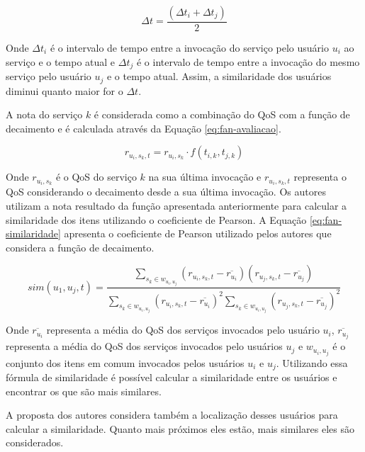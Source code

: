 \begin{equation}
  \label{eq:fan-fator-decaimento}
  \Delta t = \frac{(\Delta t_i + \Delta t_j)}{2}
\end{equation}

Onde $\Delta t_i$ é o intervalo de tempo entre a invocação do serviço pelo usuário $u_i$ ao serviço e o tempo atual e
$\Delta t_j$ é o intervalo de tempo entre a invocação do mesmo serviço pelo usuário $u_j$ e o tempo atual. Assim, a
similaridade dos usuários  diminui quanto maior for o $\Delta t$.

A nota do serviço $k$ é considerada como a combinação do QoS com a função de decaimento e é calculada através da Equação \ref{eq:fan-avaliacao}.

\begin{equation}
  \label{eq:fan-avaliacao}
  r_{u_i, s_k, t} = r_{u_i, s_k} \cdot f(t_{i,k}, t_{j,k})
\end{equation}

Onde $r_{u_i, s_k}$ é o QoS do serviço $k$ na sua última invocação e $r_{u_i, s_k, t}$ representa o QoS considerando o decaimento
desde a sua última invocação. Os autores utilizam a nota resultado da função apresentada anteriormente para calcular a similaridade dos itens utilizando
o coeficiente de Pearson. A Equação \ref{eq:fan-similaridade} apresenta o coeficiente de Pearson utilizado pelos autores
que considera a função de decaimento.

\begin{equation}
  \label{eq:fan-similaridade}
  sim(u_1, u_j, t) = \frac{\sum_{s_k \in w_{u_i, u_j}}{(r_{u_i, s_k, t} - \overline{r_{u_i}})(r_{u_j, s_k, t} - \overline{r_{u_j}})}}{\sum_{s_k \in w_{u_i, u_j}}{(r_{u_i, s_k, t} - \overline{r_{u_i}})}^2 \sum_{s_k \in w_{u_i, u_j}}{(r_{u_j, s_k, t} - \overline{r_{u_j}})}^2}
\end{equation}

Onde $\overline{r_{u_i}}$ representa a média do QoS dos serviços invocados pelo usuário $u_i$, $\overline{r_{u_j}}$
representa a média do QoS dos serviços invocados pelo usuários $u_j$ e $w_{u_i, u_j}$ é o conjunto dos itens em comum
invocados pelos usuários $u_i$ e $u_j$. Utilizando essa fórmula de similaridade é possível calcular a similaridade entre
os usuários e encontrar os que são mais similares.

A proposta dos autores considera também a localização desses usuários para calcular a similaridade. Quanto mais próximos
eles estão, mais similares eles são considerados.


